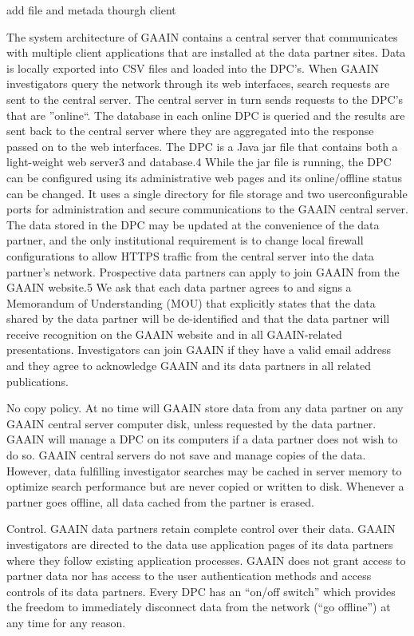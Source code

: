 \cite{egenvar}
add file and metada thourgh client

\cite{gaain}
The system architecture of GAAIN contains a central server that communicates with
multiple client applications that are installed at the
data partner sites. Data is locally exported into CSV
files and loaded into the DPC's. When GAAIN investigators
query the network through its web interfaces, search requests are sent to the central
server.  The central server in turn sends requests to the DPC's that are ''online``.
The database in each online DPC is queried and the results are
sent back to the central server where they are aggregated into the response passed on
to the web interfaces.  The DPC is a Java jar file that contains both a light-weight
web server3 and database.4 While the jar file is running, the DPC can be configured
using its administrative web pages and its online/offline status can be changed. It
uses a single directory for file storage and two userconfigurable ports for
administration and secure communications to the GAAIN central server. The data stored
in the DPC may be updated at the convenience of the data partner, and the only
institutional requirement is to change local firewall configurations to allow HTTPS
traffic from the central server into the data partner's network. Prospective data
partners can apply to join GAAIN from the GAAIN website.5 We ask that each data partner
agrees to and signs a Memorandum of Understanding (MOU) that explicitly states that the
data shared by the data partner will be de-identified and that the data partner will
receive recognition on the GAAIN website and in all GAAIN-related presentations.
Investigators can join GAAIN if they have a valid email address and they agree to
acknowledge GAAIN and its data partners in all related publications.

No copy policy. At no time will GAAIN store data from any data partner on any GAAIN
central server computer disk, unless requested by the data partner. GAAIN will manage a
DPC on its computers if a data partner does not wish to do so. GAAIN central servers do
not save and manage copies of the data. However, data fulfilling investigator searches
may be cached in server memory to optimize search performance but are never copied or
written to disk. Whenever a partner goes offline, all data cached from the partner is
erased.

Control. GAAIN data partners retain complete control over their data.  GAAIN
investigators are directed to the data use application pages of its data partners where
they follow existing application processes.  GAAIN does not grant access to partner
data nor has access to the user authentication methods and access controls of its data
partners. Every DPC has an “on/off switch” which provides the freedom to immediately
disconnect data from the network (“go offline”) at any time for any reason.

